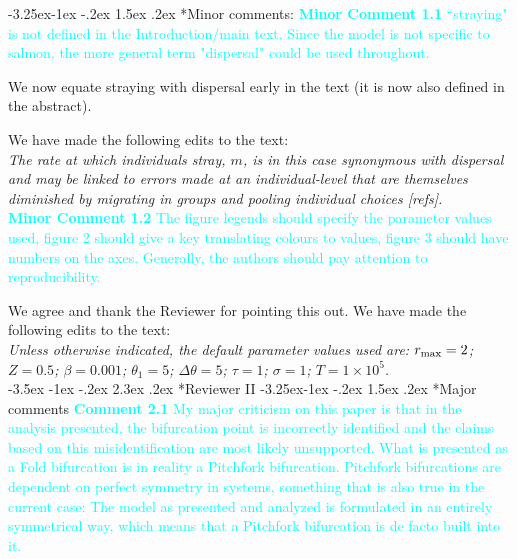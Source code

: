 \documentclass[ucm,12pt]{ucletter}
\makeatletter
\newcounter{section}
\newcounter{subsection}[section]
\renewcommand\section{\@startsection {section}{1}{\z@}%
                                   {-3.5ex \@plus -1ex \@minus -.2ex}%
                                   {2.3ex \@plus.2ex}%
                                   {\normalfont\Large\bfseries}}
\newcommand\subsection{\@startsection{subsection}{2}{\z@}%
                                     {-3.25ex\@plus -1ex \@minus -.2ex}%
                                     {1.5ex \@plus .2ex}%
                                     {\normalfont\large\bfseries}}
\makeatother
\begin{document}
\begin{letter}
\subsection*{Minor comments:}
\noindent \textcolor{cyan}{
{\bf Minor Comment 1.1} ``straying" is not defined in the Introduction/main text. Since the model is not specific to salmon, the more general term "dispersal" could be used throughout.}

 We now equate straying with dispersal early in the text (it is now also defined in the abstract).

\noindent We have made the following edits to the text:\\
 \emph{The rate at which individuals stray, $m$, is in this case synonymous with dispersal and may be linked to errors made at an individual-level that are themselves diminished by migrating in groups and pooling individual choices [refs].}\\

\noindent \textcolor{cyan}{
{\bf Minor Comment 1.2} The figure legends should specify the parameter values used, figure 2 should give a key translating colours to values, figure 3 should have numbers on the axes. Generally, the authors should pay attention to reproducibility.}

 We agree and thank the Reviewer for pointing this out. We have made the following edits to the text:\\
 \emph{Unless otherwise indicated, the default parameter values used are: $r_{\rm max}=2$; $Z=0.5$; $\beta=0.001$; $\theta_1=5$; $\Delta\theta=5$; $\tau=1$; $\sigma=1$; $T=1\times10^5$.}\\


\section*{Reviewer II}
\subsection*{Major comments}
\noindent \textcolor{cyan}{
{\bf Comment 2.1} My major criticism on this paper is that in the analysis presented, the bifurcation point is incorrectly identified and the claims based on this misidentification are most likely unsupported. What is presented as a Fold bifurcation is in reality a Pitchfork bifurcation. Pitchfork bifurcations are dependent on perfect symmetry in systems, something that is also true in the current case: The model as presented and analyzed is formulated in an entirely symmetrical way, which means that a Pitchfork bifurcation is de facto built into it.
}


\end{letter}
\end{document}
